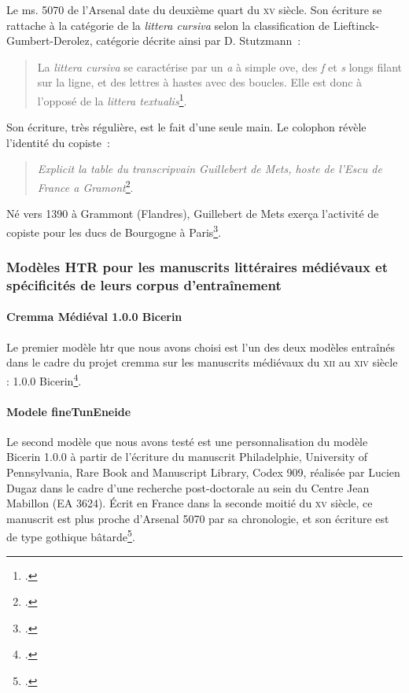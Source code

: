 \documentclass{article}
\newcommand{\siecle}[1]{\textsc{#1}\ieme}
\begin{document}
Le ms. 5070 de l'Arsenal date du deuxième quart du \siecle{xv} siècle. Son écriture se rattache à la catégorie de la \textit{littera cursiva} selon la classification de Lieftinck-Gumbert-Derolez, catégorie décrite ainsi par D. Stutzmann~:
\begin{quote}La \textit{littera cursiva} se caractérise par un \textit{a} à simple ove, des \textit{f} et \textit{s} longs filant sur la ligne, et des lettres à hastes avec des boucles. Elle est donc à l’opposé de la \textit{littera textualis}\footcite{stutzmannEcrituresGothiquesLivresques2022}.\end{quote}

Son écriture, très régulière, est le fait d'une seule main. Le colophon révèle l'identité du copiste~: \begin{quote}
	\textit{Explicit la table du transcripvain Guillebert de Mets, hoste de l'Escu de France a Gramont}\footcite{jonas-irhtParisBibliothequeArsenal2012}.
\end{quote}Né vers 1390 à Grammont (Flandres), Guillebert de Mets exerça l'activité de copiste pour les ducs de Bourgogne à Paris\footcite{jonas-irhtGuillebertMets}. 

\subsubsection{Modèles HTR pour les manuscrits littéraires médiévaux et spécificités de leurs corpus d'entraînement}
\paragraph{Cremma Médiéval 1.0.0 Bicerin}
Le premier modèle \gls{htr} que nous avons choisi est l'un des deux modèles entraînés dans le cadre du projet \gls{cremma} sur les manuscrits médiévaux du \siecle{xii} au \siecle{xiv} siècle : 1.0.0 Bicerin\footcite{pincheCREMMAMedievalOld2021}.

\paragraph{Modele fineTunEneide}
Le second modèle que nous avons testé est une personnalisation du modèle Bicerin 1.0.0 à partir de l'écriture du manuscrit Philadelphie, University of Pennsylvania, Rare Book and Manuscript Library, Codex 909, réalisée par Lucien Dugaz dans le cadre d'une recherche post-doctorale au sein du Centre Jean Mabillon (EA 3624). Écrit en France dans la seconde moitié du \siecle{xv} siècle, ce manuscrit est plus proche d'Arsenal 5070 par sa chronologie, et son écriture est de type gothique bâtarde\footcite{dugazEditionCritiqueNumerique2021, pennlibrariesMedievalRenaissanceManuscripts}.
\end{document}
